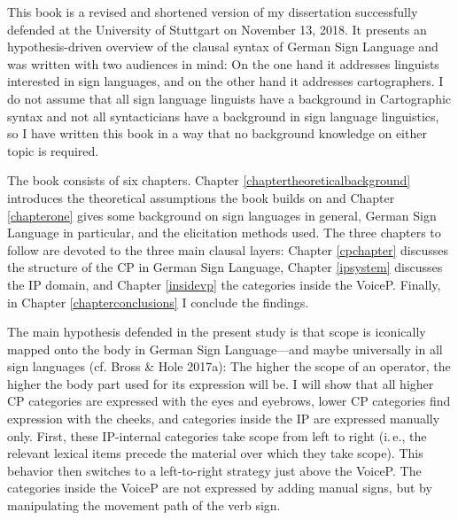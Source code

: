 

\begin{refsection}

This book is a revised and shortened version of my dissertation successfully defended at the University of Stuttgart on November 13, 2018. It presents an hypothesis-driven overview of the clausal syntax of German Sign Language and was written with two audiences in mind: On the one hand it addresses linguists interested in sign languages, and on the other hand it addresses cartographers. I do not assume that all sign language linguists have a background in Cartographic syntax and not all syntacticians have a background in sign language linguistics, so I have written this book in a way that no background knowledge on either topic is required.

The book consists of six chapters. Chapter \ref{chaptertheoreticalbackground} introduces the theoretical assumptions the book builds on and Chapter \ref{chapterone} gives some background on sign languages in general, German Sign Language in particular, and the elicitation methods used. The three chapters to follow are devoted to the three main clausal layers: Chapter \ref{cpchapter} discusses the structure of the CP in German Sign Language, Chapter \ref{ipsystem} discusses the IP domain, and Chapter \ref{insidevp} the categories inside the VoiceP. Finally, in Chapter \ref{chapterconclusions} I conclude the findings.

The main hypothesis defended in the present study is that scope is iconically mapped onto the body in German Sign Language---and maybe universally in all sign languages (cf. Bross \& Hole 2017a): The higher the scope of an operator, the higher the body part used for its expression will be. I will show that all higher CP categories are expressed with the eyes and eyebrows, lower CP categories find expression with the cheeks, and categories inside the IP are expressed manually only. First, these IP-internal categories take scope from left to right (i.\,e., the relevant lexical items precede the material over which they take scope). This behavior then switches to a left-to-right strategy just above the VoiceP. The categories inside the VoiceP are not expressed by adding manual signs, but by manipulating the movement path of the verb sign. 

\printbibliography[heading=subbibliography]
\end{refsection}